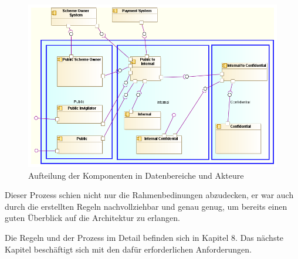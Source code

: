 \begin{figure}[!htbp]
    \centering
    \includegraphics[scale=0.55]{uml/vision4.png}
    \caption{Aufteilung der Komponenten in Datenbereiche und Akteure}
\end{figure}

Dieser Prozess schien nicht nur die Rahmenbedinungen abzudecken, er war auch durch die erstellten Regeln nachvollziehbar und genau genug, um bereits einen guten Überblick auf die Architektur zu erlangen.

Die Regeln und der Prozess im Detail befinden sich in Kapitel 8. Das nächste Kapitel beschäftigt sich mit den dafür erforderlichen Anforderungen.